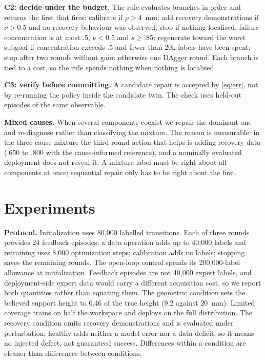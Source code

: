 \documentclass[conference]{IEEEtran}
\begin{document}
\textbf{C2: decide under the budget.} The rule evaluates branches in order and returns the first that fires: calibrate if $\rho>4$~mm; add recovery demonstrations if $\nu>0.5$ and no recovery behaviour was observed; stop if nothing localised, failure concentration is at most .5, $\nu<0.5$ and $s\ge.85$; regenerate toward the worst subgoal if concentration exceeds .5 and fewer than 20k labels have been spent; stop after two rounds without gain; otherwise one DAgger round. Each branch is tied to a cost, so the rule spends nothing when nothing is localised.

\textbf{C3: verify before committing.} A candidate repair is accepted by \eqref{eq:err}, not by re-running the policy inside the candidate twin. The check uses held-out episodes of the same observable.

\textbf{Mixed causes.} When several components coexist we repair the dominant one and re-diagnose rather than classifying the mixture. The reason is measurable: in the three-cause mixture the third-round action that helps is adding recovery data (.650 to .800 with the cause-informed reference), and a nominally evaluated deployment does not reveal it. A mixture label must be right about all components at once; sequential repair only has to be right about the first.

\section{Experiments}
\label{sec:exp}
\textbf{Protocol.} Initialization uses 80,000 labelled transitions. Each of three rounds provides 24 feedback episodes; a data operation adds up to 40,000 labels and retraining uses 8,000 optimization steps; calibration adds no labels; stopping saves the remaining rounds. The open-loop control spends its 200,000-label allowance at initialization. Feedback episodes are not 40,000 expert labels, and deployment-side expert data would carry a different acquisition cost, so we report both quantities rather than equating them. The geometric condition sets the believed support height to 0.46 of the true height (9.2 against 20~mm). Limited coverage trains on half the workspace and deploys on the full distribution. The recovery condition omits recovery demonstrations and is evaluated under perturbation; healthy adds neither a model error nor a data deficit, so it means no injected defect, not guaranteed success. Differences within a condition are cleaner than differences between conditions.
\end{document}
